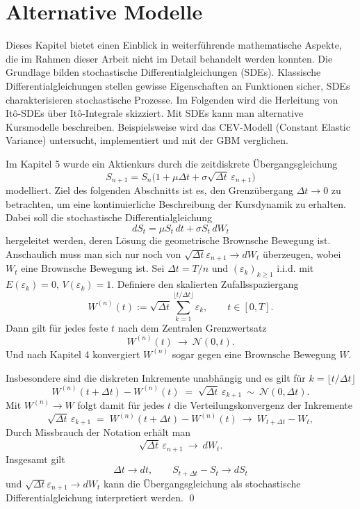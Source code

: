 \section{Alternative Modelle}

Dieses Kapitel bietet einen Einblick in weiterführende mathematische Aspekte, die im Rahmen dieser Arbeit nicht im Detail behandelt werden konnten.
Die Grundlage bilden stochastische Differentialgleichungen (SDEs). Klassische Differentialgleichungen stellen gewisse
Eigenschaften an Funktionen sicher, SDEs charakterisieren stochastische Prozesse. Im Folgenden wird die Herleitung von It\^o-SDEs über It\^o-Integrale skizziert. 
Mit SDEs kann man alternative Kursmodelle beschreiben. Beispielsweise wird das CEV-Modell (Constant Elastic Variance) untersucht, implementiert
und mit der GBM verglichen.

\begin{bem}

Im Kapitel 5 wurde ein Aktienkurs durch die zeitdiskrete Übergangsgleichung
$$S_{n+1} = S_n \big(1 + \mu \Delta t + \sigma \sqrt{\Delta t}\,\varepsilon_{n+1}\big)$$
modelliert. Ziel des folgenden Abschnitts ist es, den Grenzübergang $\Delta t \to 0$ zu betrachten,
um eine kontinuierliche Beschreibung der Kursdynamik zu erhalten. Dabei soll die stochastische Differentialgleichung
$$dS_t = \mu S_t\,dt + \sigma S_t\,dW_t$$
hergeleitet werden, deren Lösung die geometrische Brownsche Bewegung ist. 
Anschaulich muss man sich nur noch von $\sqrt{\Delta t} \varepsilon_{n+1} \to dW_t$ überzeugen, wobei $W_t$ eine Brownsche Bewegung ist.
Sei $\Delta t = T/n$ und $(\varepsilon_k)_{k\ge 1}$ i.i.d. mit $E(\varepsilon_k)=0$, $V(\varepsilon_k)=1$.
Definiere den skalierten Zufallsspaziergang
$$
W^{(n)}(t) := \sqrt{\Delta t}\sum_{k=1}^{\lfloor t/\Delta t\rfloor}\varepsilon_k,\qquad t\in[0,T].
$$
Dann gilt für jedes feste $t$ nach dem Zentralen Grenzwertsatz
$$
W^{(n)}(t)\ \to\ \mathcal N(0,t).
$$
Und nach Kapitel 4 konvergiert $W^{(n)}$ sogar gegen eine Brownsche Bewegung $W$.

Insbesondere sind die diskreten Inkremente unabhängig und es gilt für $k=\lfloor t/\Delta t\rfloor$
$$
W^{(n)}(t+\Delta t)-W^{(n)}(t)\;=\;\sqrt{\Delta t}\,\varepsilon_{k+1}\ \sim\ \mathcal N(0,\Delta t).
$$
Mit $W^{(n)}\to W$ folgt damit für jedes $t$ die Verteilungskonvergenz der Inkremente
$$
\sqrt{\Delta t}\,\varepsilon_{k+1}
\;=\;W^{(n)}(t+\Delta t)-W^{(n)}(t)\ \to \ W_{t+\Delta t}-W_t,
$$
Durch Missbrauch der Notation erhält man
$$
\sqrt{\Delta t}\,\varepsilon_{n+1}\ \to\ dW_t.
$$
Insgesamt gilt
$$\Delta t \to dt, \qquad S_{t + \Delta t} - S_t \to dS_t$$
und $\sqrt{\Delta t} \varepsilon_{n+1} \to dW_t$
kann die Übergangsgleichung als stochastische Differentialgleichung interpretiert werden.
\qed

\end{bem}

